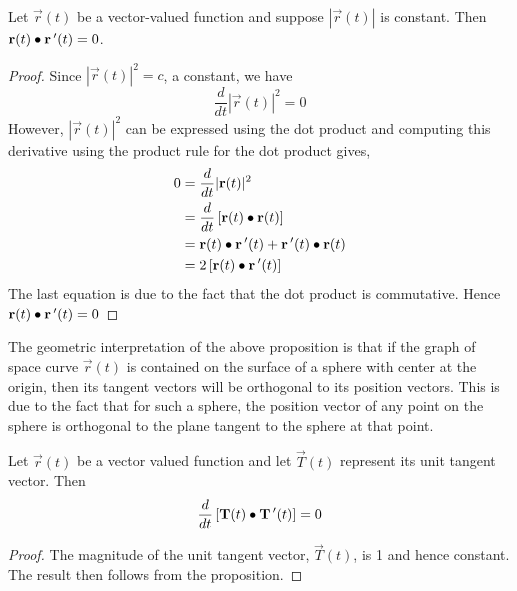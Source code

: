 \documentclass[handout]{ximera}
\begin{document}
\begin{proposition}
Let $\vec r(t)$ be a vector-valued function and suppose $|\vec r(t)|$ is constant. Then $\mathbf r(t) \bullet \mathbf r\,'(t) = 0$.\\
\end{proposition}
\begin{proof}
Since $|\vec r(t)|^2 = c$, a constant, we have
\[
\frac{d}{dt} |\vec r(t)|^2 = 0
\]
However, $|\vec r(t)|^2$ can be expressed using the dot product and computing this derivative using the product rule for the dot product gives,
\begin{align*}
0 &= \frac{d}{dt} |\mathbf r(t)|^2 \\
&= \frac{d}{dt} \left[\mathbf r(t) \bullet \mathbf r(t)\right] \\
  &= \mathbf r(t) \bullet \mathbf r\,'(t) + \mathbf r\,'(t) \bullet \mathbf r(t) \\
  &= 2 \left[\mathbf r(t) \bullet \mathbf r\,'(t)\right]
\end{align*}
The last equation is due to the fact that the dot product is commutative. Hence $\mathbf r(t) \bullet \mathbf r\,'(t) = 0$
\end{proof}

\begin{remark}
The geometric interpretation of the above proposition is that if the graph of space curve $\vec r(t)$ is contained 
on the surface of a sphere with center at the origin,
then its tangent vectors will be orthogonal to its position vectors.  
This is due to the fact that for such a sphere, the position vector of any point on the sphere is 
orthogonal to the plane tangent to the sphere at that point.
\end{remark}


\begin{corollary}
Let $\vec r(t)$ be a vector valued function and let $\vec T(t)$ represent its unit tangent vector.
Then 
\[
\frac{d}{dt}\left[\mathbf T(t) \bullet \mathbf T\,'(t)\right] = 0
\]
\end{corollary}
\begin{proof}
The magnitude of the unit tangent vector, $\vec T(t)$, is 1 and hence constant. The result then follows from the proposition.
\end{proof}
\end{document}
